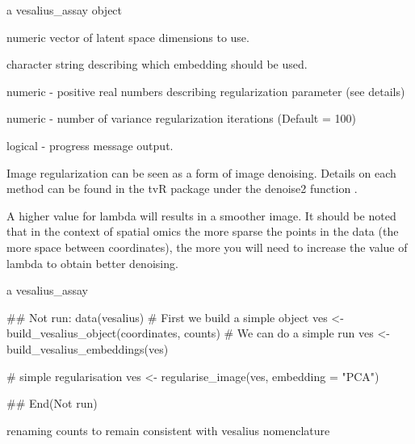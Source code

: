 \documentclass[a4paper]{book}
\begin{document}
\begin{Arguments}
\begin{ldescription}
\item[\code{vesalius\_assay}] a vesalius\_assay object

\item[\code{dimensions}] numeric vector of latent space dimensions to use.

\item[\code{embedding}] character string describing which embedding should
be used.

\item[\code{lambda}] numeric - positive real numbers describing regularization
parameter (see details)

\item[\code{niter}] numeric - number of variance regularization iterations
(Default = 100)

\item[\code{verbose}] logical - progress message output.
\end{ldescription}
\end{Arguments}
%
\begin{Details}
Image regularization can be seen as a form of image denoising.
Details on each method can be found in the tvR package under the denoise2
function .

A higher value for lambda will results in a smoother image. It should be noted
that in the context of spatial omics the more sparse the points in the data
(the more space between coordinates), the more you will need to increase
the value of lambda to obtain better denoising.
\end{Details}
%
\begin{Value}
a vesalius\_assay
\end{Value}
%
\begin{Examples}
\begin{ExampleCode}
## Not run: 
data(vesalius)
# First we build a simple object
ves <- build_vesalius_object(coordinates, counts)
# We can do a simple run
ves <- build_vesalius_embeddings(ves)

# simple regularisation
ves <- regularise_image(ves, embedding = "PCA")

## End(Not run)
\end{ExampleCode}
\end{Examples}
%
\begin{Description}
renaming counts to remain consistent with vesalius nomenclature
\end{Description}
\end{document}
